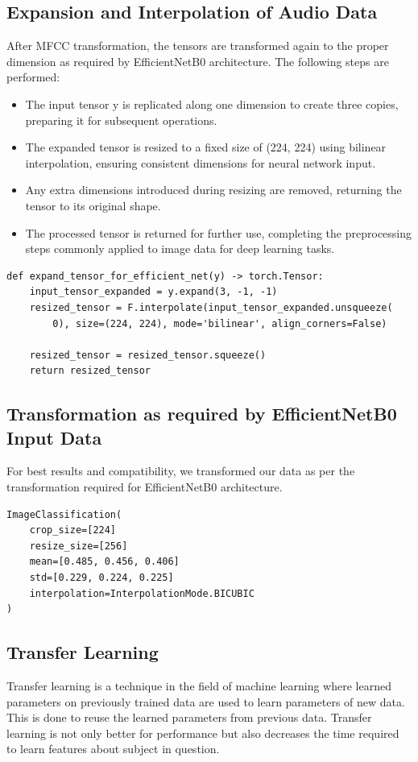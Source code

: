 \documentclass[fleqn, 10pt, twoside]{IOEGC}
\begin{document}
\subsection{Expansion and Interpolation of Audio Data}
After MFCC transformation, the tensors are transformed again to the proper dimension as required by EfficientNetB0 architecture. The following steps are performed:
\begin{itemize}
	\item The input tensor y is replicated along one dimension to create three copies, preparing it for subsequent operations.
	\item The expanded tensor is resized to a fixed size of (224, 224) using bilinear interpolation, ensuring consistent dimensions for neural network input.
	\item Any extra dimensions introduced during resizing are removed, returning the tensor to its original shape.
	\item The processed tensor is returned for further use, completing the preprocessing steps commonly applied to image data for deep learning tasks.
\end{itemize}
\begin{lstlisting}[style=mystyle,caption={MFCC Transformation Function},captionpos=b]
def expand_tensor_for_efficient_net(y) -> torch.Tensor:
    input_tensor_expanded = y.expand(3, -1, -1)
    resized_tensor = F.interpolate(input_tensor_expanded.unsqueeze(
        0), size=(224, 224), mode='bilinear', align_corners=False)

    resized_tensor = resized_tensor.squeeze()
    return resized_tensor
\end{lstlisting}

\subsection{Transformation as required by EfficientNetB0 Input Data}
For best results and compatibility, we transformed our data as per the transformation required for EfficientNetB0 architecture.
\begin{lstlisting}[style=mystyle,caption={MFCC Transformation Function},captionpos=b]
ImageClassification(
    crop_size=[224]
    resize_size=[256]
    mean=[0.485, 0.456, 0.406]
    std=[0.229, 0.224, 0.225]
    interpolation=InterpolationMode.BICUBIC
)
\end{lstlisting}

\subsection{Transfer Learning}
Transfer learning is a technique in the field of machine learning where learned parameters on previously trained data are used to learn parameters of new data. This is done to reuse the learned parameters from previous data. Transfer learning is not
only better for performance but also decreases the time required to learn features about
subject in question.
\end{document}
